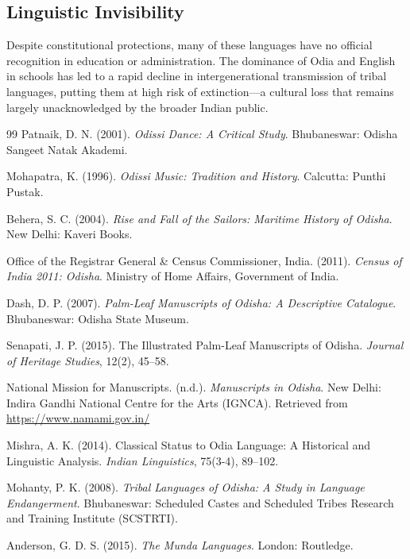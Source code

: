 \documentclass[12pt]{article}
\begin{document}
\subsection{Linguistic Invisibility}
Despite constitutional protections, many of these languages have no official recognition in education or administration. The dominance of Odia and English in schools has led to a rapid decline in intergenerational transmission of tribal languages, putting them at high risk of extinction—a cultural loss that remains largely unacknowledged by the broader Indian public.

\begin{thebibliography}{99}
     Patnaik, D. N. (2001). \textit{Odissi Dance: A Critical Study}. Bhubaneswar: Odisha Sangeet Natak Akademi.

     Mohapatra, K. (1996). \textit{Odissi Music: Tradition and History}. Calcutta: Punthi Pustak.

     Behera, S. C. (2004). \textit{Rise and Fall of the Sailors: Maritime History of Odisha}. New Delhi: Kaveri Books.

     Office of the Registrar General \& Census Commissioner, India. (2011). \textit{Census of India 2011: Odisha}. Ministry of Home Affairs, Government of India.

     Dash, D. P. (2007). \textit{Palm-Leaf Manuscripts of Odisha: A Descriptive Catalogue}. Bhubaneswar: Odisha State Museum.

     Senapati, J. P. (2015). The Illustrated Palm-Leaf Manuscripts of Odisha. \textit{Journal of Heritage Studies}, 12(2), 45–58.

     National Mission for Manuscripts. (n.d.). \textit{Manuscripts in Odisha}. New Delhi: Indira Gandhi National Centre for the Arts (IGNCA). Retrieved from \url{https://www.namami.gov.in/}

     Mishra, A. K. (2014). Classical Status to Odia Language: A Historical and Linguistic Analysis. \textit{Indian Linguistics}, 75(3-4), 89–102.

     Mohanty, P. K. (2008). \textit{Tribal Languages of Odisha: A Study in Language Endangerment}. Bhubaneswar: Scheduled Castes and Scheduled Tribes Research and Training Institute (SCSTRTI).

     Anderson, G. D. S. (2015). \textit{The Munda Languages}. London: Routledge.

\end{thebibliography}
\end{document}

